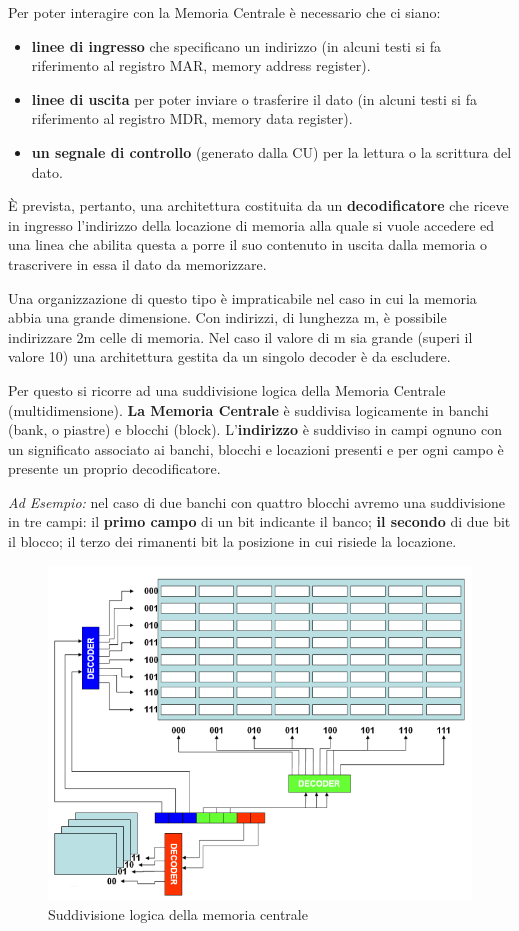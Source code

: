 \documentclass[12pt]{article}
\begin{document}
Per poter interagire con la Memoria Centrale è necessario che ci siano:
\begin{itemize}
    \item \textbf{linee di ingresso} che specificano un indirizzo (in alcuni testi si fa riferimento al registro MAR, memory address register).
    \item \textbf{linee di uscita} per poter inviare o trasferire il dato (in alcuni testi si fa riferimento al registro MDR, memory data register).
    \item \textbf{un segnale di controllo} (generato dalla CU) per la lettura o la scrittura del dato.\par\medskip\noindent
\end{itemize}
È prevista, pertanto, una architettura costituita da un \textbf{decodificatore} che riceve in ingresso 
l’indirizzo della locazione di memoria alla quale si vuole accedere ed una linea che abilita questa a porre il suo contenuto in uscita dalla memoria o trascrivere in essa il dato da memorizzare.\par\medskip\noindent
Una organizzazione di questo tipo è impraticabile nel caso in cui la memoria abbia una grande dimensione. Con indirizzi, di lunghezza m, è possibile indirizzare 2m celle di memoria. Nel caso il valore di m sia grande (superi il valore 10) una architettura gestita da un singolo decoder è da escludere.\par\medskip\noindent
Per questo si ricorre ad una suddivisione logica della Memoria Centrale (multidimensione). \textbf{La Memoria Centrale} è suddivisa logicamente in banchi (bank, o piastre) e blocchi (block). L’\textbf{indirizzo} è suddiviso in campi ognuno con un significato associato ai banchi, blocchi e locazioni presenti e per ogni campo è presente un proprio decodificatore.\par\medskip\noindent
\textit{Ad Esempio:} nel caso di due banchi con quattro blocchi avremo una suddivisione in
tre campi: il \textbf{primo campo} di un bit indicante il banco; \textbf{il secondo} di due bit il blocco; il terzo dei rimanenti bit la posizione in cui risiede la locazione.
\newpage
\begin{figure}[t]
    \centering
    \includegraphics[width=0.75\linewidth]{Memoria Centrale .png}
    \caption{Suddivisione logica della memoria centrale}
    \label{fig:enter-label}
\end{figure}
\end{document}
